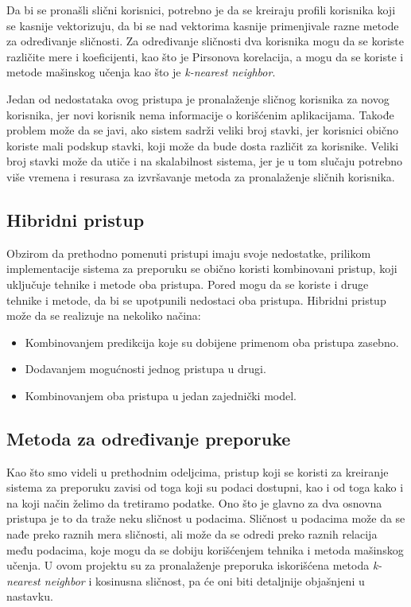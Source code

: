 \documentclass[a4paper,12pt,titlepage]{article}
\begin{document}
Da bi se pronašli slični korisnici, potrebno je da se kreiraju profili korisnika koji se kasnije vektorizuju, da bi se nad vektorima kasnije primenjivale razne metode za određivanje sličnosti. Za određivanje sličnosti dva korisnika mogu da se koriste različite mere i koeficijenti, kao što je Pirsonova korelacija, a mogu da se koriste i metode mašinskog učenja kao što je \emph{k-nearest neighbor}.

Jedan od nedostataka ovog pristupa je pronalaženje sličnog korisnika za novog korisnika, jer novi korisnik nema informacije o korišćenim aplikacijama. Takođe problem može da se javi, ako sistem sadrži veliki broj stavki, jer korisnici obično koriste mali podskup stavki, koji može da bude dosta različit za korisnike. Veliki broj stavki može da utiče i na skalabilnost sistema, jer je u tom slučaju potrebno više vremena i resurasa za izvršavanje metoda za pronalaženje sličnih korisnika.


\subsection{Hibridni pristup}

Obzirom da prethodno pomenuti pristupi imaju svoje nedostatke, prilikom implementacije sistema za preporuku se obično koristi kombinovani pristup, koji uključuje tehnike i metode oba pristupa. Pored mogu da se koriste i druge tehnike i metode, da bi se upotpunili nedostaci oba pristupa. Hibridni pristup može da se realizuje na nekoliko načina:

\begin{itemize}
\item Kombinovanjem predikcija koje su dobijene primenom oba pristupa zasebno.
\item Dodavanjem mogućnosti jednog pristupa u drugi.
\item Kombinovanjem oba pristupa u jedan zajednički model.
\end{itemize}


\subsection{Metoda za određivanje preporuke}

Kao što smo videli u prethodnim odeljcima, pristup koji se koristi za kreiranje sistema za preporuku zavisi od toga koji su podaci dostupni, kao i od toga kako i na koji način želimo da tretiramo podatke. Ono što je glavno za dva osnovna pristupa je to da traže neku sličnost u podacima. Sličnost u podacima može da se nađe preko raznih mera sličnosti, ali može da se odredi preko raznih relacija među podacima, koje mogu da se dobiju korišćenjem tehnika i metoda mašinskog učenja. U ovom projektu su za pronalaženje preporuka iskorišćena metoda \emph{k-nearest neighbor} i kosinusna sličnost, pa će oni biti detaljnije objašnjeni u nastavku.
\end{document}
